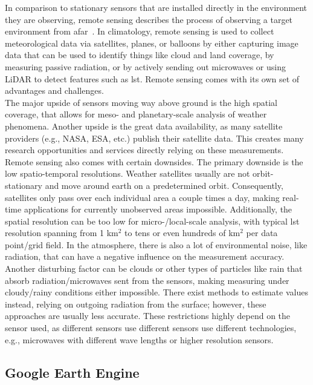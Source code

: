 In comparison to stationary sensors that are installed directly in the environment they are observing, remote sensing describes the process of observing a target environment from afar~\cite{campbell2011introduction}. In climatology, remote sensing is used to collect meteorological data via satellites, planes, or balloons by either capturing image data that can be used to identify things like cloud and land coverage, by measuring passive radiation, or by actively sending out microwaves or using LiDAR to detect features such as \gls{lst}. Remote sensing comes with its own set of advantages and challenges.\\
The major upside of sensors moving way above ground is the high spatial coverage, that allows for meso- and planetary-scale analysis of weather phenomena. Another upside is the great data availability, as many satellite providers (e.g., NASA, ESA, etc.) publish their satellite data. This creates many research opportunities and services directly relying on these measurements.\\
Remote sensing also comes with certain downsides. The primary downside is the low spatio-temporal resolutions. Weather satellites usually are not orbit-stationary and move around earth on a predetermined orbit. Consequently, satellites only pass over each individual area a couple times a day, making real-time applications for currently unobserved areas impossible. Additionally, the spatial resolution can be too low for micro-/local-scale analysis, with typical \gls{lst} resolution spanning from 1 km$^{2}$ to tens or even hundreds of km$^{2}$ per data point/grid field. In the atmosphere, there is also a lot of environmental noise, like radiation, that can have a negative influence on the measurement accuracy. Another disturbing factor can be clouds or other types of particles like rain that absorb radiation/microwaves sent from the sensors, making measuring under cloudy/rainy conditions either impossible. There exist methods to estimate values instead, relying on outgoing radiation from the surface; however, these approaches are usually less accurate. These restrictions highly depend on the sensor used, as different sensors use different sensors use different technologies, e.g., microwaves with different wave lengths or higher resolution sensors.

\subsection{Google Earth Engine}

